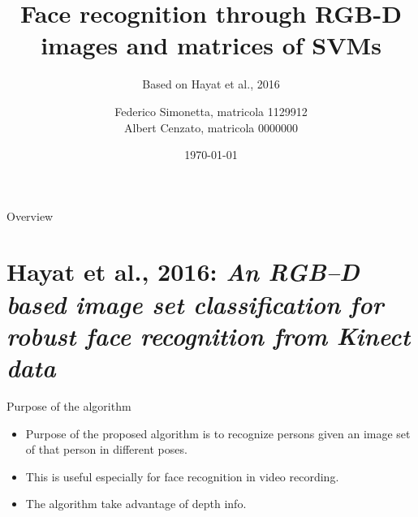\documentclass{beamer}
\title{Face recognition through RGB-D images and matrices of SVMs} %
\subtitle{Based on Hayat et al., 2016}
\date{\today}
\author{Federico Simonetta, matricola 1129912 \\[1ex] Albert Cenzato, matricola 0000000 }
\begin{document}
\maketitle
{}

\begin{frame}{Overview}
	\vspace*{6mm}
\end{frame}

\section{Hayat et al., 2016: \textit{An RGB–D based image set classification
for robust face recognition from Kinect data}}
\begin{frame}{Purpose of the algorithm}
	\begin{itemize}
		\item Purpose of the proposed algorithm is to recognize persons
			given an image set of that person in different poses.
		\item This is useful especially for face recognition in video
			recording.
		\item The algorithm take advantage of depth info.
	\end{itemize}
	\vspace*{-8mm}

\end{frame}
\end{document}
